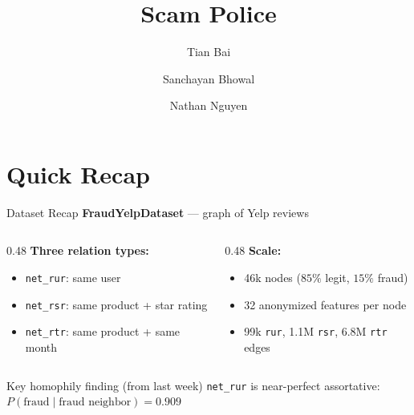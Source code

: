 \documentclass[10pt]{beamer}
\title[Milestone 4]{Scam Police}
\author{Tian Bai \and Sanchayan Bhowal \and Nathan Nguyen}
\date{}
\begin{document}
\begin{frame}
    \titlepage
\end{frame}

\section{Quick Recap}

\begin{frame}{Dataset Recap}
    \textbf{FraudYelpDataset} --- graph of Yelp reviews
    \vspace{0.5em}
    \begin{columns}[T]
        \begin{column}{0.48\textwidth}
            \textbf{Three relation types:}
            \begin{itemize}
                \item \texttt{net\_rur}: same user
                \item \texttt{net\_rsr}: same product + star rating
                \item \texttt{net\_rtr}: same product + same month
            \end{itemize}
        \end{column}
        \begin{column}{0.48\textwidth}
            \textbf{Scale:}
            \begin{itemize}
                \item 46k nodes ($85\%$ legit, $15\%$ fraud)
                \item 32 anonymized features per node
                \item 99k \texttt{rur}, 1.1M \texttt{rsr}, 6.8M \texttt{rtr} edges
            \end{itemize}
        \end{column}
    \end{columns}

    \vspace{0.6em}
    \begin{alertblock}{Key homophily finding (from last week)}
        \texttt{net\_rur} is near-perfect assortative: $P(\text{fraud} \mid \text{fraud neighbor}) = 0.909$
    \end{alertblock}
\end{frame}
\end{document}
